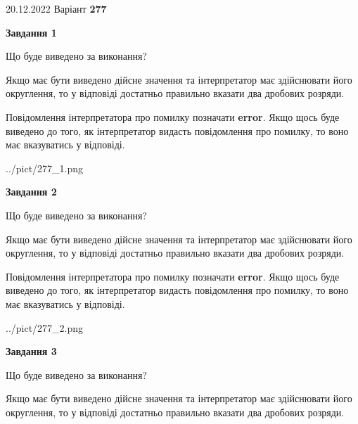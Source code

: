 \documentclass[12pt, ukrainian]{article}
\begin{document}
{20.12.2022 Варіант \No \textbf { 277 }\par}
{
\begin {Large}

{\begin {center}\textbf{Завдання 1}\end {center}}\par
Що буде виведено за виконання? \par

Якщо має бути виведено дійсне значення та інтерпретатор має здійснювати його округлення, 
то у відповіді достатньо правильно вказати два дробових розряди.

Повідомлення інтерпретатора про помилку позначати \textbf{error}.
Якщо щось буде виведено до того, як інтерпретатор видасть повідомлення про помилку, 
то воно має вказуватись у відповіді. \par

\begin{center}
	{../pict/277_1.png}
\end{center}
\newpage

{\begin {center}\textbf{Завдання 2}\end {center}}\par
Що буде виведено за виконання? \par

Якщо має бути виведено дійсне значення та інтерпретатор має здійснювати його округлення, 
то у відповіді достатньо правильно вказати два дробових розряди.

Повідомлення інтерпретатора про помилку позначати \textbf{error}.
Якщо щось буде виведено до того, як інтерпретатор видасть повідомлення про помилку, 
то воно має вказуватись у відповіді. \par

\begin{center}
	{../pict/277_2.png}
\end{center}
\newpage

{\begin {center}\textbf{Завдання 3}\end {center}}\par
Що буде виведено за виконання? \par

Якщо має бути виведено дійсне значення та інтерпретатор має здійснювати його округлення, 
то у відповіді достатньо правильно вказати два дробових розряди.


\end{Large}}
\end{document}
